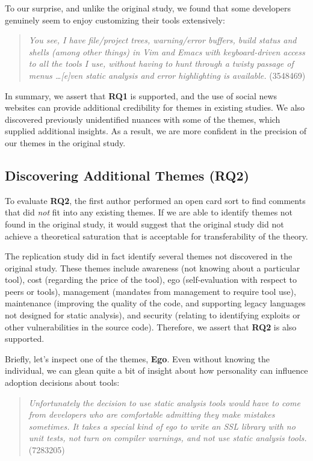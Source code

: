 \documentclass{sig-alternate}
\begin{document}
To our surprise, and unlike the original study, we found that some developers genuinely seem to enjoy customizing their tools extensively:

\begin{quote}
\textit{You see, I have file/project trees, warning/error buffers, build status and shells (among other things) in Vim and Emacs with keyboard-driven access to all the tools I use, without having to hunt through a twisty passage of menus \ldots [e]ven static analysis and error highlighting is available.} (3548469)
\end{quote}

In summary, we assert that \textbf{RQ1} is supported, and the use of social news websites can provide additional credibility for themes in existing studies. We also discovered previously unidentified nuances with some of the themes, which supplied additional insights. As a result, we are more confident in the precision of our themes in the original study.

\subsection{Discovering Additional Themes (RQ2)}

To evaluate \textbf{RQ2}, the first author performed an open card sort to find comments that did \textit{not} fit into any existing themes. If we are able to identify themes not found in the original study, it would suggest that the original study did not achieve a theoretical saturation that is acceptable for transferability of the theory.

The replication study did in fact identify several themes not discovered in the original study. These themes include awareness (not knowing about a particular tool), cost (regarding the price of the tool), ego (self-evaluation with respect to peers or tools), management (mandates from management to require tool use), maintenance (improving the quality of the code, and supporting legacy languages not designed for static analysis), and security (relating to identifying exploits or other vulnerabilities in the source code). Therefore, we assert that \textbf{RQ2} is also supported.

Briefly, let's inspect one of the themes, \textbf{Ego}. Even without knowing the individual, we can glean quite a bit of insight about how personality can influence adoption decisions about tools:

\begin{quote}
\textit{Unfortunately the decision to use static analysis tools would have to come from developers who are comfortable admitting they make mistakes sometimes. It takes a special kind of ego to write an SSL library with no unit tests, not turn on compiler warnings, and not use static analysis tools.} (7283205)
\end{quote}
\end{document}
